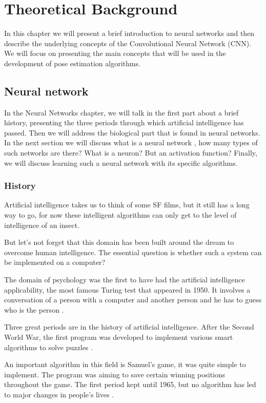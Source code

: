 \chapter{Theoretical Background}

In this chapter we will present a brief introduction to neural networks and then describe the underlying concepts of the Convolutional Neural Network (CNN).
We will focus on presenting the main concepts that will be used in the development of pose estimation algorithms.

\section{Neural network}

In the Neural Networks chapter, we will talk in the first part about a brief history, presenting the three periods through which artificial intelligence has passed.
Then we will address the biological part that is found in neural networks.
In the next section we will discuss what is a neural network , how many types of such networks are there? What is a neuron? But an activation function?
Finally, we will discuss learning such a neural network with its specific algorithms.

\subsection{History}
Artificial intelligence takes us to think of some SF films, 
but it still has a long way to go, for now these intelligent algorithms can
only get to the level of intelligence of an insect.

But let's not forget that this domain has been built around the dream to overcome human intelligence.
The essential question is whether such a system can be implemented on a computer?

The domain of psychology was the first to have had the artificial intelligence applicability, 
the most famous Turing test that appeared in 1950. 
It involves a conversation of a person with a computer and another person and he has to guess who is the person \cite{historyofneuronalnetwork}. 

Three great periods are in the history of artificial intelligence. 
After the Second World War, the first program was developed to implement various smart algorithms to solve puzzles \cite{historyofneuronalnetwork}. 

An important algorithm in this field is Samuel's game, it was quite simple to implement.
The program was aiming to save certain winning positions throughout the game.
The first period kept until 1965, but no algorithm has led to major changes in people's lives \cite{historyofneuronalnetwork}.

